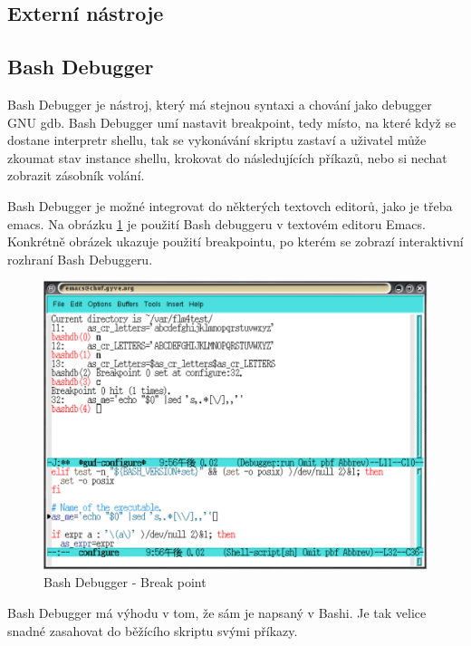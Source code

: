\documentclass[thesis=M,czech]{FITthesis}[2012/06/26]
\begin{document}


\subsection{Externí nástroje}



\subsection{Bash Debugger}

Bash Debugger je nástroj, který má stejnou syntaxi a chování jako debugger GNU gdb. Bash Debugger umí nastavit breakpoint, tedy místo, na které když se dostane interpretr shellu, tak se vykonávání skriptu zastaví a uživatel může zkoumat stav instance shellu, krokovat do následujících příkazů, nebo si nechat zobrazit zásobník volání.

Bash Debugger je možné integrovat do některých textovch editorů, jako je třeba emacs. Na obrázku \ref{fig:bashdb} je použití Bash debuggeru v textovém editoru Emacs. Konkrétně obrázek ukazuje použití breakpointu, po kterém se zobrazí interaktivní rozhraní Bash Debuggeru.


\begin{figure}[htb]\centering
	\includegraphics[width=\textwidth]{./images/bashdb-break_invert}
	\caption{Bash Debugger - Break point}
	\label{fig:bashdb}
\end{figure}

Bash Debugger má výhodu v tom, že sám je napsaný v Bashi. Je tak velice snadné zasahovat do běžícího skriptu svými příkazy.
\end{document}
